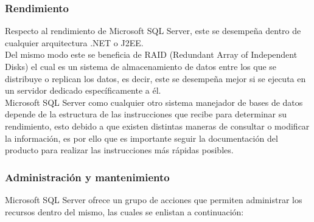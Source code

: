 		\subsubsection{Rendimiento}

			Respecto al rendimiento de Microsoft SQL Server, este se desempe\~na dentro de cualquier arquitectura .NET o J2EE.\\

			Del mismo modo este se beneficia de RAID (Redundant Array of Independent Disks) el cual es un sistema de almacenamiento de datos entre los que se distribuye o replican los datos, es decir, este se desempe\~na mejor si se ejecuta en un servidor dedicado espec\'ificamente a \'el.\\

			Microsoft SQL Server como cualquier otro sistema manejador de bases de datos depende de la estructura de las instrucciones que recibe para determinar su rendimiento, esto debido a que existen distintas maneras de consultar o modificar la informaci\'on, es por ello que es importante seguir la documentaci\'on del producto para realizar las instrucciones m\'as r\'apidas posibles.

		\subsubsection{Administraci\'on y mantenimiento}

			Microsoft SQL Server ofrece un grupo de acciones que permiten administrar los recursos dentro del mismo, las cuales se enlistan a continuaci\'on:


